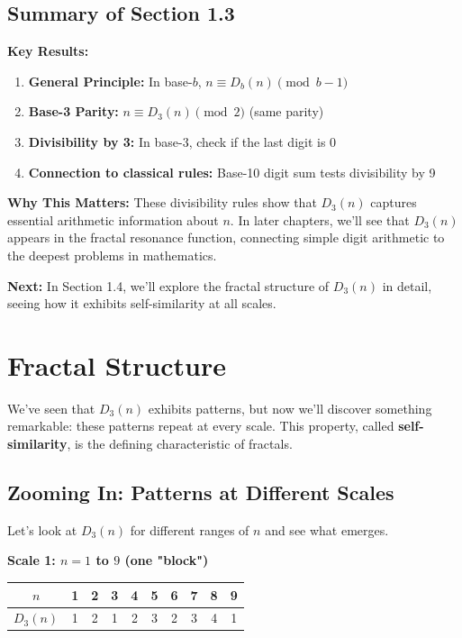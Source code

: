 \subsection{Summary of Section 1.3}

\textbf{Key Results:}
\begin{enumerate}
\item \textbf{General Principle:} In base-$b$, $n \equiv D_b(n) \pmod{b-1}$
\item \textbf{Base-3 Parity:} $n \equiv D_3(n) \pmod{2}$ (same parity)
\item \textbf{Divisibility by 3:} In base-3, check if the last digit is 0
\item \textbf{Connection to classical rules:} Base-10 digit sum tests divisibility by 9
\end{enumerate}

\textbf{Why This Matters:} These divisibility rules show that $D_3(n)$ captures essential arithmetic information about $n$. In later chapters, we'll see that $D_3(n)$ appears in the fractal resonance function, connecting simple digit arithmetic to the deepest problems in mathematics.

\textbf{Next:} In Section 1.4, we'll explore the fractal structure of $D_3(n)$ in detail, seeing how it exhibits self-similarity at all scales.

\section{Fractal Structure}
\label{sec:fractal-structure}

We've seen that $D_3(n)$ exhibits patterns, but now we'll discover something remarkable: these patterns repeat at every scale. This property, called \textbf{self-similarity}, is the defining characteristic of fractals.

\subsection{Zooming In: Patterns at Different Scales}
\label{subsec:zooming-in}


Let's look at $D_3(n)$ for different ranges of $n$ and see what emerges.

\begin{center}
\textbf{Scale 1: $n = 1$ to $9$ (one "block")}
\begin{tabular}{c|c|c|c|c|c|c|c|c|c}
$n$ & 1 & 2 & 3 & 4 & 5 & 6 & 7 & 8 & 9 \\
\hline
$D_3(n)$ & 1 & 2 & 1 & 2 & 3 & 2 & 3 & 4 & 1 \\
\end{tabular}
\end{center}

